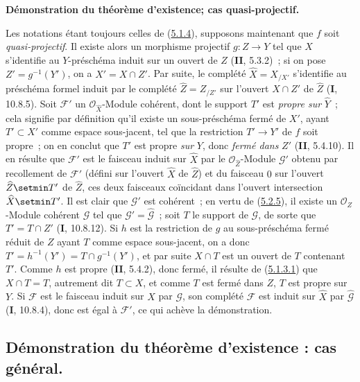 \begin{env}[5.2.6]
\label{III.5.2.6-fr}
\textbf{Démonstration du théorème d'existence; cas quasi-projectif.}

Les notations étant toujours celles de (\hyperref[III.5.1.4-fr]{5.1.4}), supposons
maintenant que $f$ soit \emph{quasi-projectif}. Il existe alors un morphisme projectif
$g:Z\to Y$ tel que $X$ s'identifie au $Y$-préschéma induit sur un ouvert de $Z$
(\textbf{II}, 5.3.2)~; si on pose $Z'=g^{-1}(Y')$, on a $X'=X\cap Z'$. Par suite, le
complété $\widehat X=X_{/X'}$ s'identifie au préschéma formel induit par le complété
$\widehat Z=Z_{/Z'}$ sur l'ouvert $X\cap Z'$ de $\widehat Z$ (\textbf{I}, 10.8.5). Soit
$\mathcal F'$ un $\mathcal O_{\widehat X}$-Module cohérent, dont le support $T'$ est
\emph{propre sur} $\widehat Y$~; cela signifie par définition qu'il existe un sous-préschéma
fermé de $X'$, ayant $T'\subset X'$ comme espace sous-jacent, tel que la restriction
$T'\to Y'$ de $f$ soit propre~; on en conclut que $T'$ est propre \emph{sur} $Y$, donc
\emph{fermé dans} $Z'$ (\textbf{II}, 5.4.10). Il en résulte que $\mathcal F'$ est le faisceau induit
sur $\widehat X$ par le $\mathcal O_{\widehat Z}$-Module $\mathcal G'$ obtenu par
recollement de $\mathcal F'$ (défini sur l'ouvert $\widehat X$ de $\widehat Z$) et
du faisceau $0$ sur l'ouvert $\widehat Z\setmin T'$ de $\widehat Z$, ces deux faisceaux
coïncidant dans l'ouvert intersection $\widehat X\setmin T'$. Il est clair que
$\mathcal G'$ est cohérent~; en vertu de
(\hyperref[III.5.2.5-fr]{5.2.5}), il existe un $\mathcal O_Z$-Module cohérent
$\mathcal G$ tel que $\mathcal G'=\widehat{\mathcal G}$~; soit $T$ le support de
$\mathcal G$, de sorte que $T'=T\cap Z'$ (\textbf{I}, 10.8.12). Si $h$ est la restriction
de $g$ au sous-préschéma fermé réduit de $Z$ ayant $T$ comme espace sous-jacent, on
a donc $T'=h^{-1}(Y')=T\cap g^{-1}(Y')$, et par suite $X\cap T$ est un ouvert de
$T$ contenant $T'$.
Comme $h$ est propre (\textbf{II}, 5.4.2), donc fermé, il résulte de
(\hyperref[III.5.1.3.1-fr]{5.1.3.1}) que $X\cap T=T$, autrement dit $T\subset X$,
et comme $T$ est fermé dans $Z$, $T$ est propre sur $Y$. Si $\mathcal F$ est le
faisceau induit sur $X$ par $\mathcal G$, son complété $\widehat{\mathcal F}$ est
induit sur $\widehat X$ par $\widehat{\mathcal G}$ (\textbf{I}, 10.8.4), donc est égal à
$\mathcal F'$, ce qui achève la démonstration.
\end{env}

\subsection{Démonstration du théorème d'existence : cas général.}
\label{subsection:III.5.3-fr}

